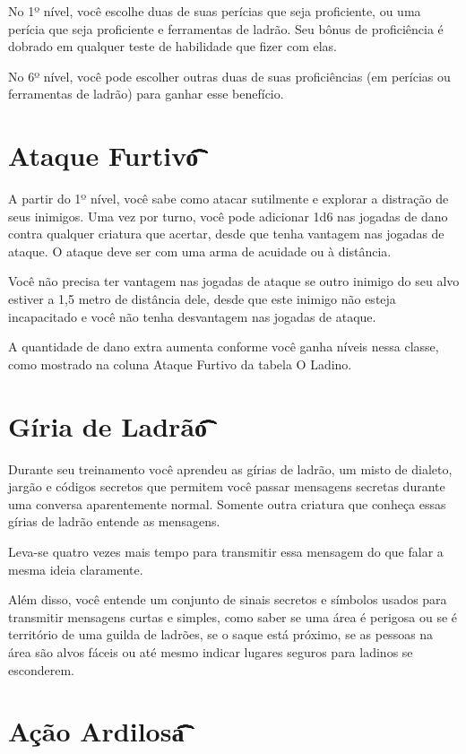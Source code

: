 \documentclass{RPG_Adventure}[2021/10/20]
\begin{document}
No 1º nível, você escolhe duas de suas perícias que seja proficiente, ou uma
perícia que seja proficiente e ferramentas de ladrão. Seu bônus de proficiência
é dobrado em qualquer teste de habilidade que fizer com elas.

No 6º nível, você pode escolher outras duas de suas proficiências (em perícias
ou ferramentas de ladrão) para ganhar esse benefício.

\section*{Ataque Furtivo\t\t\t\t\t\t\t\t\t}%
\label{sec:ataque_furtivo}

A partir do 1º nível, você sabe como atacar sutilmente e explorar a distração de
seus inimigos. Uma vez por turno, você pode adicionar 1d6 nas jogadas de dano
contra qualquer criatura que acertar, desde que tenha vantagem nas jogadas de
ataque. O ataque deve ser com uma arma de acuidade ou à distância.

Você não precisa ter vantagem nas jogadas de ataque se outro inimigo do seu alvo
estiver a 1,5 metro de distância dele, desde que este inimigo não esteja
incapacitado e você não tenha desvantagem nas jogadas de ataque.

A quantidade de dano extra aumenta conforme você ganha níveis nessa classe, como
mostrado na coluna Ataque Furtivo da tabela O Ladino.

\section*{Gíria de Ladrão\t\t\t\t\t\t\t\t}%
\label{sec:giria_de_ladrao}

Durante seu treinamento você aprendeu as gírias de ladrão, um misto de dialeto,
jargão e códigos secretos que permitem você passar mensagens secretas durante
uma conversa aparentemente normal. Somente outra criatura que conheça essas
gírias de ladrão entende as mensagens.

Leva-se quatro vezes mais tempo para transmitir essa mensagem do que falar a
mesma ideia claramente.

Além disso, você entende um conjunto de sinais secretos e símbolos usados para
transmitir mensagens curtas e simples, como saber se uma área é perigosa ou se é
território de uma guilda de ladrões, se o saque está próximo, se as pessoas na
área são alvos fáceis ou até mesmo indicar lugares seguros para ladinos se
esconderem.

\section*{Ação Ardilosa\t\t\t\t\t\t\t\t\t\t}%
\label{sec:acao_ardilosa}
\end{document}
